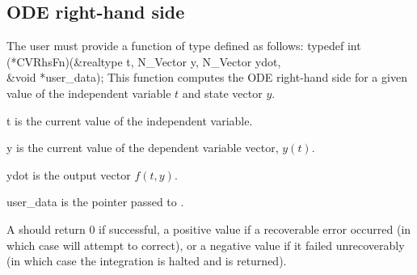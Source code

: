 \subsection{ODE right-hand side} \label{ss:rhsFn}
The user must provide a function of type  defined as follows:
{
  typedef int (*CVRhsFn)(&realtype t, N\_Vector y, N\_Vector ydot, \\
                         &void *user\_data);
}
{
  This function computes the ODE right-hand side for a given value
  of the independent variable $t$ and state vector $y$.
}
{
  \begin{args}
  \item[t]
    is the current value of the independent variable.
  \item[y]
    is the current value of the dependent variable vector, $y(t)$.
  \item[ydot]
    is the output vector $f(t,y)$.
  \item[user\_data]
    is the 
    pointer passed to .
  \end{args}
}
{
  A  should return 0 if successful, a positive value if a recoverable
  error occurred (in which case {\cvodes} will attempt to correct), or a negative
  value if it failed unrecoverably (in which case the integration is halted and
   is returned).
}
